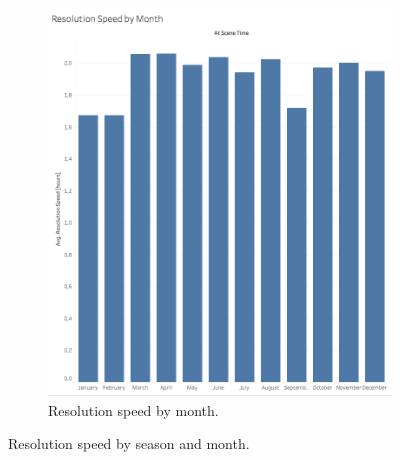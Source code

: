 \begin{figure}[h!]
\begin{subfigure}{0.4\textwidth}
    \end{subfigure}
    \begin{subfigure}{0.6\textwidth}
        \centering
        \includegraphics[width=0.84\linewidth]{figures/3_3_resolution_speed_by_month}
        \caption{Resolution speed by month.}
        \label{fig:3_3_resolution_speed_by_month}
    \end{subfigure}
    \caption{Resolution speed by season and month.}
    \label{fig:3_3_resolution_speed_by_season_and_month}
\end{figure}

